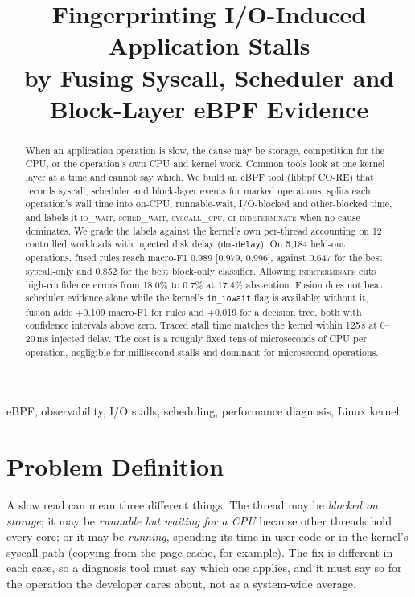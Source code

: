\documentclass[conference]{IEEEtran}
\newcommand{\lbl}[1]{\textsc{#1}}
\newcommand{\IO}{\lbl{io\_wait}}
\newcommand{\SCHED}{\lbl{sched\_wait}}
\newcommand{\CPU}{\lbl{syscall\_cpu}}
\newcommand{\IND}{\lbl{indeterminate}}
\begin{document}
\title{Fingerprinting I/O-Induced Application Stalls\\ by Fusing Syscall, Scheduler and Block-Layer eBPF Evidence}

\author{}

\maketitle

\begin{abstract}
When an application operation is slow, the cause may be storage, competition for the CPU, or the operation's own CPU and kernel work. Common tools look at one kernel layer at a time and cannot say which. We build an eBPF tool (libbpf CO-RE) that records syscall, scheduler and block-layer events for marked operations, splits each operation's wall time into on-CPU, runnable-wait, I/O-blocked and other-blocked time, and labels it \IO, \SCHED, \CPU, or \IND{} when no cause dominates. We grade the labels against the kernel's own per-thread accounting on 12 controlled workloads with injected disk delay (\texttt{dm-delay}). On 5,184 held-out operations, fused rules reach macro-F1 0.989 [0.979, 0.996], against 0.647 for the best syscall-only and 0.852 for the best block-only classifier. Allowing \IND{} cuts high-confidence errors from 18.0\% to 0.7\% at 17.4\% abstention. Fusion does not beat scheduler evidence alone while the kernel's \texttt{in\_iowait} flag is available; without it, fusion adds +0.109 macro-F1 for rules and +0.019 for a decision tree, both with confidence intervals above zero. Traced stall time matches the kernel within 125\,\textmu s at 0--20\,ms injected delay. The cost is a roughly fixed tens of microseconds of CPU per operation, negligible for millisecond stalls and dominant for microsecond operations.
\end{abstract}

\begin{IEEEkeywords}
eBPF, observability, I/O stalls, scheduling, performance diagnosis, Linux kernel
\end{IEEEkeywords}

\section{Problem Definition}
A slow read can mean three different things. The thread may be \emph{blocked on storage}; it may be \emph{runnable but waiting for a CPU} because other threads hold every core; or it may be \emph{running}, spending its time in user code or in the kernel's syscall path (copying from the page cache, for example). The fix is different in each case, so a diagnosis tool must say which one applies, and it must say so for the operation the developer cares about, not as a system-wide average.
\end{document}
